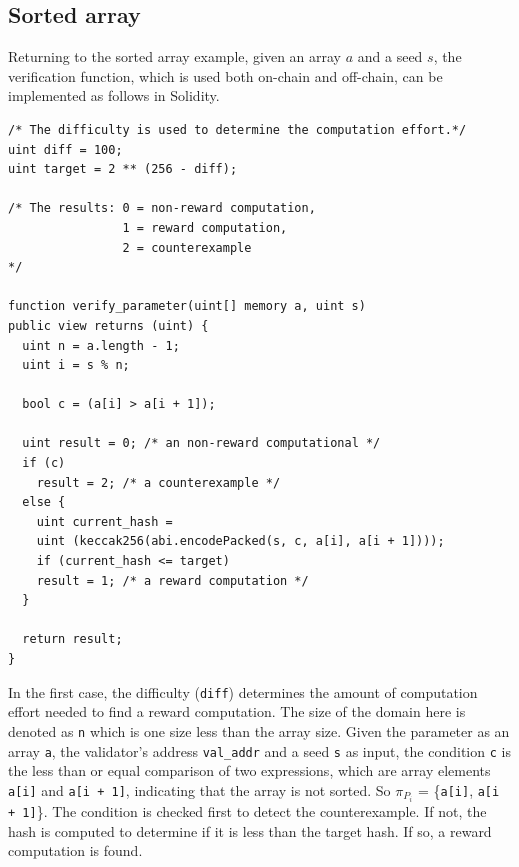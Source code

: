 \documentclass[runningheads]{llncs}
\begin{document}
\subsection{Sorted array}

Returning to the sorted array example, given an array $a$ and a seed $s$, the verification function, which is used both on-chain and off-chain, can be implemented as follows in Solidity.
\begin{lstlisting}[numbers=none]
/* The difficulty is used to determine the computation effort.*/
uint diff = 100;
uint target = 2 ** (256 - diff); 

/* The results: 0 = non-reward computation,
                1 = reward computation, 
                2 = counterexample 
*/

function verify_parameter(uint[] memory a, uint s)
public view returns (uint) {
  uint n = a.length - 1; 
  uint i = s % n;
       
  bool c = (a[i] > a[i + 1]);

  uint result = 0; /* an non-reward computational */ 
  if (c)  
    result = 2; /* a counterexample */
  else {
    uint current_hash = 
    uint (keccak256(abi.encodePacked(s, c, a[i], a[i + 1])));
    if (current_hash <= target) 
    result = 1; /* a reward computation */ 
  }             
  
  return result;           
}

\end{lstlisting}

In the first case, the difficulty (\lstinline|diff|) determines the amount of computation effort needed to find a reward computation. The size of the domain here is denoted as \lstinline|n| which is one size less than the array size. Given the parameter as an array \lstinline|a|, the validator's address  \lstinline|val_addr| and a seed \lstinline|s| as input, the condition \lstinline|c| is the less than or equal comparison of two expressions, which are array elements \lstinline|a[i]| and \lstinline|a[i + 1]|, indicating that the array is not sorted. So $\pi_{P_{i}}$ = \{\lstinline|a[i]|, \lstinline|a[i + 1]|\}. 
The condition is checked first to detect the counterexample. If not, the hash is computed to determine if it is less than the target hash. If so, a reward computation is found.
\end{document}
